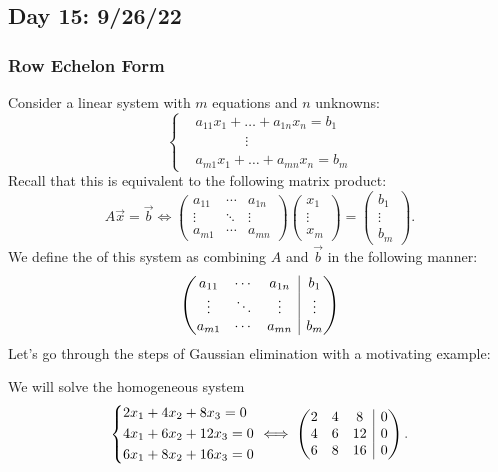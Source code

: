 \documentclass[main.tex]{subfiles}
\begin{document}
\subsection{Day 15: 9/26/22}

\subsubsection{Row Echelon Form}

Consider a linear system with $m$ equations and $n$ unknowns:
\[\left\{\begin{aligned}
    &a_{11}x_1 + \ldots + a_{1n}x_n = b_1 \\
    &\phantom{hey guys}\vdots \\
    &a_{m1}x_1 + \ldots + a_{mn}x_n = b_m
\end{aligned}\right.\]
Recall that this is equivalent to the following matrix product:
\[A\vec{x} = \vec{b} \iff \begin{pmatrix}
    a_{11} & \cdots & a_{1n} \\
    \vdots & \ddots & \vdots \\
    a_{m1} & \cdots & a_{mn}
\end{pmatrix}\begin{pmatrix}
x_1 \\ \vdots \\ x_m\end{pmatrix} = \begin{pmatrix} b_1 \\ \vdots \\ b_m\end{pmatrix}.
\]
We define the  of this system as combining $A$ and $\vec{b}$ in the following manner:
\[\parens{\begin{array}{@{}c c c | c@{}}
    a_{11} & \cdots & a_{1n} & b_1 \\
    \vdots & \ddots & \vdots & \vdots \\
    a_{m1} & \cdots & a_{mn} & b_m
\end{array}}\]
Let's go through the steps of Gaussian elimination with a motivating example:
\begin{example}
    We will solve the homogeneous system
    \[\left\{\begin{aligned}
        &2x_1 + 4x_2 + 8x_3 = 0 \\
        &4x_1 + 6x_2 + 12x_3 = 0 \\
        &6x_1 + 8x_2 + 16x_3 = 0
    \end{aligned}\right. \iff \left(\begin{array}{@{}c c c | c@{}}
    2 & 4 & 8 & 0 \\
    4 & 6 & 12 & 0 \\
    6 & 8 & 16 & 0
\end{array}
\right).\]
\end{example}
\end{document}
